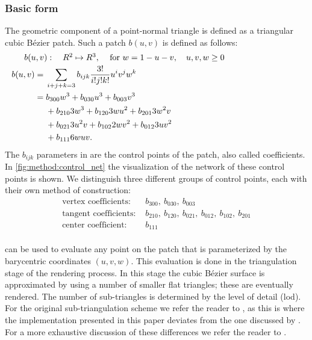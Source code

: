 \subsubsection{Basic form}
\label{sss:method:geometry:basicForm}
	The geometric component of a point-normal triangle is defined as a triangular cubic Bézier patch. Such a patch $b(u,v)$ is defined as follows:
	\begin{align}
	\noalign{$b(u,v): \quad R^2 \mapsto R^3,\quad$ for $w = 1 - u - v, \quad u, v, w \geq 0$}
	\begin{split}\label{eq:method:cubic_bezier_patch}
	    b(u,v) ={}& \sum_{i + j + k = 3} b_{ijk}\frac{3!}{i!j!k!} u^i v^j w^k\\
	      	   ={}& b_{300}w^3 + b_{030}u^3 + b_{003}v^3\\
	      	    {}& + b_{210}3w^3 + b_{120}3wu^2 + b_{201}3w^2v\\
	      	    {}& + b_{021}3u^2v + b_{102}2wv^2 + b_{012}3uv^2\\
	      	    {}& + b_{111}6wuv.
	\end{split}
	\end{align}
	The $b_{ijk}$ parameters in  are the control points of the patch, also called coefficients. In \cref{fig:method:control_net} the visualization of the network of these control points is shown. We distinguish three different groups of control points, each with their own method of construction: 
	\begin{align*}
		\text{vertex coefficients: } {}&  b_{300},\ b_{030},\ b_{003} \\
		\text{tangent coefficients: } {}&  b_{210},\ b_{120},\ b_{021},\ b_{012},\ b_{102},\ b_{201}\\
		\text{center coefficient: }   {}&  b_{111}\\
	\end{align*}

	 can be used to evaluate any point on the patch that is parameterized by the barycentric coordinates $(u,v,w)$. This evaluation is done in the triangulation stage of the rendering process. In this stage the cubic Bézier surface is approximated by using a number of smaller flat triangles; these are eventually rendered. The number of sub-triangles is determined by the level of detail (lod). For the original sub-triangulation scheme we refer the reader to \textcite{vlachos2001curved}, as this is where the implementation presented in this paper deviates from the one discussed by \citeauthor{vlachos2001curved}. For a more exhaustive discussion of these differences we refer the reader to .

